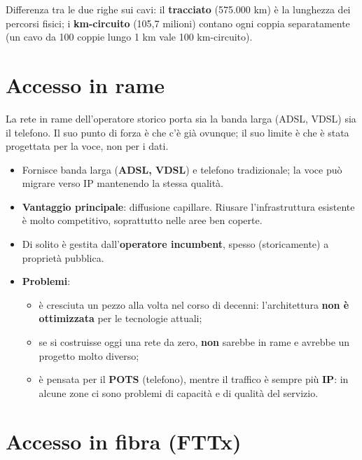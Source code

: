 Differenza tra le due righe sui cavi: il \textbf{tracciato} (575.000 km) è la lunghezza dei percorsi fisici; i \textbf{km-circuito} (105,7 milioni) contano ogni coppia separatamente (un cavo da 100 coppie lungo 1 km vale 100 km-circuito).

\section{Accesso in rame}

\begin{inbreve}

La rete in rame dell'operatore storico porta sia la banda larga (ADSL, VDSL) sia il telefono. Il suo punto di forza è che c'è già ovunque; il suo limite è che è stata progettata per la voce, non per i dati.

\end{inbreve}

\begin{itemize}
\tightlist
\item
  Fornisce banda larga (\textbf{ADSL, VDSL}) e telefono tradizionale; la voce può migrare verso IP mantenendo la stessa qualità.
\item
  \textbf{Vantaggio principale}: diffusione capillare. Riusare l'infrastruttura esistente è molto competitivo, soprattutto nelle aree ben coperte.
\item
  Di solito è gestita dall'\textbf{operatore incumbent}, spesso (storicamente) a proprietà pubblica.
\item
  \textbf{Problemi}:

  \begin{itemize}
  \tightlist
  \item
    è cresciuta un pezzo alla volta nel corso di decenni: l'architettura \textbf{non è ottimizzata} per le tecnologie attuali;
  \item
    se si costruisse oggi una rete da zero, \textbf{non} sarebbe in rame e avrebbe un progetto molto diverso;
  \item
    è pensata per il \textbf{POTS} (telefono), mentre il traffico è sempre più \textbf{IP}: in alcune zone ci sono problemi di capacità e di qualità del servizio.
  \end{itemize}
\end{itemize}

\section{Accesso in fibra (FTTx)}

